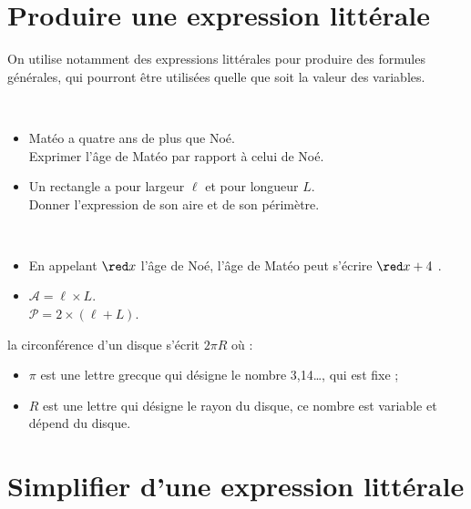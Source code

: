 \section{Produire une expression littérale}

On utilise notamment des expressions littérales pour produire des  formules générales, qui pourront être utilisées quelle que soit la valeur des variables.

\begin{exemple}[0.55]
\ \\ [-10mm]
   \begin{itemize}
      \item Matéo a quatre ans de plus que Noé. \\
         Exprimer l'âge de Matéo par rapport à celui de Noé.
      \item Un rectangle a pour largeur $\ell$ et pour longueur $L$. \\
         Donner l'expression de son aire et de son périmètre.
   \end{itemize}
   \correction
      \ \\ [-10mm]
      \begin{itemize}
         \item En appelant \og $\red x$ \fg{} l'âge de Noé, l'âge de Matéo peut s'écrire \og ${\red x}+4$ \fg.
         \item $\mathcal{A} =\ell\times L$. \\
         $\mathcal{P} =2\times(\ell+L)$.
      \end{itemize}
\end{exemple}

\medskip

\begin{remarque}
   la circonférence d'un disque s'écrit $2\pi R$ où :
   \begin{itemize}
      \item $\pi$ est une lettre grecque qui désigne le nombre 3,14\dots, qui est fixe ;
      \item $R$ est une lettre qui désigne le rayon du disque, ce nombre est variable et dépend du disque.
   \end{itemize}
\end{remarque}


\section{Simplifier d'une expression littérale}

